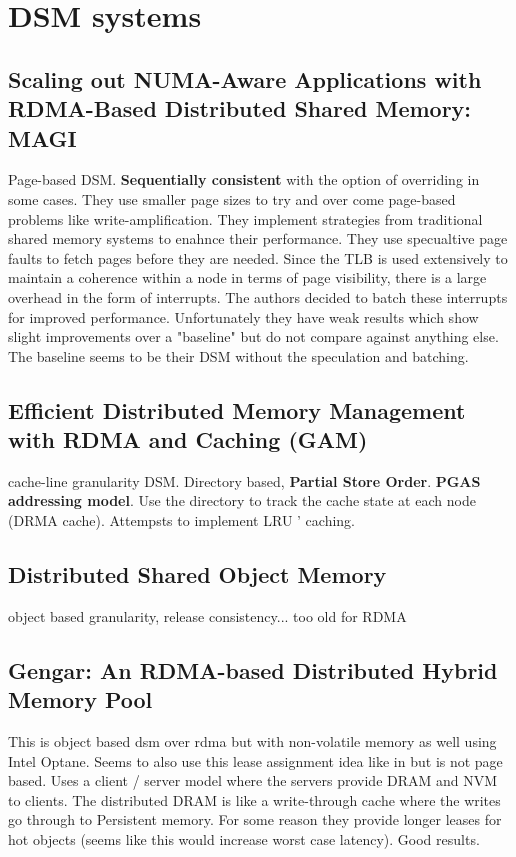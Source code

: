 \documentclass[sigplan,nonacm]{acmart}
\begin{document}
\section {DSM systems}

    \subsection{Scaling out NUMA-Aware Applications with RDMA-Based Distributed Shared Memory: MAGI}
    Page-based DSM. \textbf{Sequentially consistent} with the option of overriding in some cases. They use 
    smaller page sizes to try and over come page-based problems like write-amplification. They implement 
    strategies from traditional shared memory systems to enahnce their performance. They use specualtive 
    page faults to fetch pages before they are needed. Since the TLB is used extensively to maintain 
    a coherence within a node in terms of page visibility, there is a large overhead in the form of interrupts.
    The authors decided to batch these interrupts for improved performance. Unfortunately they have weak results
    which show slight improvements over a "baseline" but do not compare against anything else. The baseline seems to be 
    their DSM without the speculation and batching.\cite{Hong-JCST-2019}

    \subsection{Efficient Distributed Memory Management with RDMA and Caching (GAM) }
    cache-line granularity DSM. Directory based, \textbf{Partial Store Order}. \textbf{PGAS addressing model}. 
    Use the directory to track the cache state at each node (DRMA cache). Attempsts to implement LRU '
    caching. \cite{Cai-VLDB-2018}

    \subsection{Distributed Shared Object Memory}
    object based granularity, release consistency... too old for RDMA\cite{Guedes-WWOSIII-1993} %

    \subsection{Gengar: An RDMA-based Distributed Hybrid Memory Pool}
    This is object based dsm over rdma but with non-volatile memory as well using Intel Optane. Seems to 
    also use this lease assignment idea like in \cite{Endo-IPDRM-2020} but is not page based. Uses a client / 
    server model where the servers provide DRAM and NVM to clients. The distributed DRAM is like a write-through 
    cache where the writes go through to Persistent memory. For some reason they provide longer leases 
    for hot objects (seems like this would increase worst case latency). Good results. \cite{Duan-ICDCS-2021}
\end{document}

